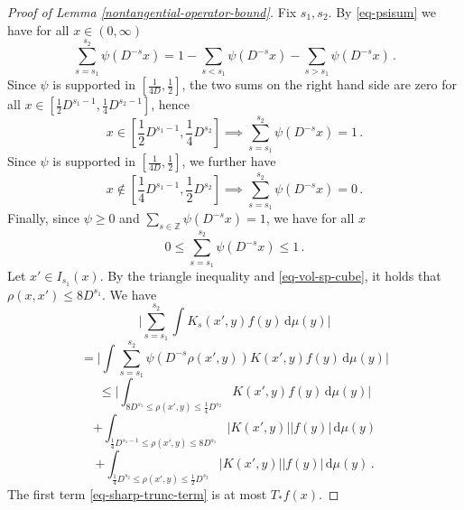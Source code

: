 {\begin{proof}[Proof of Lemma \ref{nontangential-operator-bound}]
    Fix $s_1, s_2$. By \eqref{eq-psisum} we have for all $x \in (0, \infty)$
    $$
        \sum_{s = s_1}^{s_2} \psi(D^{-s}x) = 1 - \sum_{s < s_1} \psi(D^{-s}x) - \sum_{s > s_1} \psi(D^{-s}x)\,.
    $$
    Since $\psi$ is supported in $[\frac{1}{4D}, \frac{1}{2}]$, the two sums on the right hand side are zero for all $x \in [\frac{1}{2}D^{s_1-1}, \frac{1}{4} D^{s_2 - 1}]$, hence
    $$
        x \in  [\frac{1}{2}D^{s_1-1}, \frac{1}{4} D^{s_2}] \implies \sum_{s = s_1}^{s_2} \psi(D^{-s}x) = 1\,.
    $$
    Since $\psi$ is supported in $[\frac{1}{4D}, \frac{1}{2}]$, we further have
    $$
        x \notin [\frac{1}{4}D^{s_1 - 1}, \frac{1}{2}D^{s_2}] \implies \sum_{s = s_1}^{s_2} \psi(D^{-s}x) = 0\,.
    $$
    Finally, since $\psi \ge 0$ and $\sum_{s \in \mathbb{Z}} \psi(D^{-s}x) = 1$, we have for all $x$
    $$
        0 \le \sum_{s = s_1}^{s_2} \psi(D^{-s}x) \le 1\,.
    $$
    Let $x' \in I_{s_1}(x)$. By the triangle inequality and \eqref{eq-vol-sp-cube}, it holds that $\rho(x,x') \le 8D^{s_1}$. We have
    $$
        \Bigg|\sum_{s = s_1}^{s_2} \int K_s(x',y) f(y) \, \mathrm{d}\mu(y)\Bigg|
    $$
    $$
        = \Bigg|\int \sum_{s = s_1}^{s_2} \psi(D^{-s}\rho(x',y)) K(x',y) f(y) \, \mathrm{d}\mu(y)\Bigg|
    $$
    \begin{equation}
        \label{eq-sharp-trunc-term}
        \le \Bigg| \int_{8D^{s_1} \le \rho(x',y) \le \frac{1}{4}D^{s_2}} K(x',y) f(y) \, \mathrm{d}\mu(y) \Bigg|
    \end{equation}
    \begin{equation}
        \label{eq-lower-bound-term}
        + \int_{\frac{1}{4}D^{s_1-1} \le \rho(x',y) \le 8D^{s_1}} |K(x', y)| |f(y)| \, \mathrm{d}\mu(y)
    \end{equation}
    \begin{equation}
        \label{eq-upper-bound-term}
        + \int_{\frac{1}{4}D^{s_2} \le \rho(x',y) \le \frac{1}{2}D^{s_2}} |K(x', y)| |f(y)| \, \mathrm{d}\mu(y)\,.
    \end{equation}
    The first term \eqref{eq-sharp-trunc-term} is at most $T_* f(x)$.


\end{proof}}
